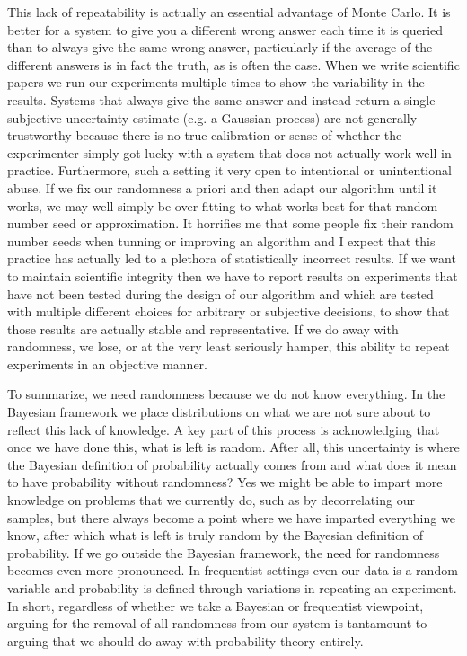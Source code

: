 This lack of repeatability is actually an essential advantage of Monte Carlo.  It is better for a system to give you
a different wrong answer each time it is queried than to always give the same wrong answer, particularly if the average
of the different answers is in fact the truth, as is often the case.  When we write scientific papers we run our experiments
multiple times to show the variability in the results.  Systems that always give the same answer and instead return
a single subjective uncertainty estimate (e.g. a Gaussian process) are not generally trustworthy because there is no
true calibration or sense of whether the experimenter simply got lucky with a system that does not actually work well
in practice.  Furthermore, such a setting it very open to intentional or unintentional abuse.  If we fix our randomness
a priori and then adapt our algorithm until it works, we may well simply be over-fitting to what works best for that
random number seed or approximation.  It horrifies me that some people fix their random number seeds when 
tunning or improving an algorithm and I expect that this practice has actually led to a plethora of statistically incorrect
results.  If we want to maintain scientific integrity then we have to report results on experiments that have not been
tested during the design of our algorithm and which are tested with multiple different choices for arbitrary or subjective
decisions, to show that those results are actually stable and representative.  If we do away with randomness, we lose, or at the very least
seriously hamper, this ability to repeat experiments in an objective manner.

To summarize, we need randomness because we do not know everything.  In the Bayesian framework we place distributions
on what we are not sure about to reflect this lack of knowledge.  A key part of this process is acknowledging that once we
have done this, what is left is random.  After all, this uncertainty is where the Bayesian definition of probability actually comes
from and what does it mean to have probability without randomness?  Yes we might be able to impart more knowledge on
problems that we currently do, such as by decorrelating our samples, but there always become a point where we have
imparted everything we know, after which what is left is truly random by the Bayesian definition of
probability.  If we go outside the Bayesian framework, the need for randomness becomes even more pronounced.  In
frequentist settings even our data is a random variable and probability is defined through variations in repeating an
experiment.  In short, regardless of whether we take a Bayesian or frequentist viewpoint, arguing for the 
removal of all randomness from our system is tantamount to arguing that we should do away with probability
theory entirely.